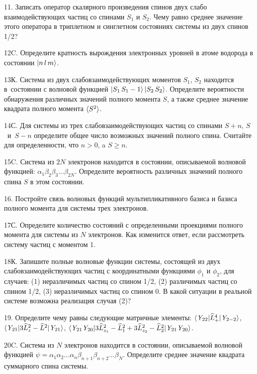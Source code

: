 \par
11. Записать оператор скалярного произведения спинов двух слабо взаимодействующих частиц со спинами $S_1$ и $S_2$. Чему равно среднее значение этого оператора в триплетном и синглетном состояниях системы из двух спинов 1/2?
\par
12C. Определите кратность вырождения электронных уровней в атоме водорода в состоянии $\ket{n\,l\,m} $.
\par
13К. Система из двух слабовзаимодействующих моментов $S_1$, $S_2$ находится в~состоянии с волновой функцией $\ket{S_1\,S_1-1}\ket{S_2\,S_2}$. Определите вероятности обнаружения различных значений полного момента $S$, а также среднее значение квадрата полного момента $\braket{S^2}$.
\par
14С. Для системы из трех слабовзаимодействующих частиц со спинами $S + n$, $S$~и~$S - n$ определите общее число возможных значений полного спина. Считайте для определенности, что $n > 0$, a $S \geq n$.
\par
15C. Система из $2N$ электронов находится в состоянии, описываемой волновой функцией: $\alpha_1\beta_2\beta_3 \ldots \beta_{2N}$. Определите вероятность различных значений полного спина $S$ в этом состоянии.
\par
16. Постройте связь волновых функций мультипликативного базиса и базиса полного момента для системы трех электронов.
\par
17С. Определите количество состояний с определенными проекциями полного момента для системы из $N$ электронов. Как изменится ответ, если рассмотреть систему частиц с моментом 1.
\par
18К. Запишите полные волновые функции системы, состоящей из двух слабовзаимодействующих частиц с координатными функциями $\phi_1$ и $\phi_2$, для случаев: (1) неразличимых частиц со спином 1/2, (2) различимых частиц со спином 1/2, (3) неразличимых частиц со спином 0. В какой ситуации в реальной системе возможна реализация случая (2)?
\par
19. Определите чему равны следующие матричные элементы: $\braket{\textit{Y}_{22}|\widehat L^4_+|\textit{Y}_{2-2}}$, $\braket{\textit{Y}_{21}|3\widehat L_{z}^2- \widehat L^2|\textit{Y}_{21}}$, $\braket{\textit{Y}_{21}\textit{Y}_{20}|3 \widehat L_{z_1}^2- \widehat L_1^2+3 \widehat L_{z_2}^2- \widehat L_2^2|\textit{Y}_{21}\textit{Y}_{20}}$.
\par
20C. Система из $N$ электронов находится в состоянии, описываемой волновой функцией $\psi=\alpha_1\alpha_2 \ldots \alpha_n\beta_{n+1}\beta_{n+2} \ldots \beta_{N}$. Определите среднее значение квадрата суммарного спина системы.
\par
